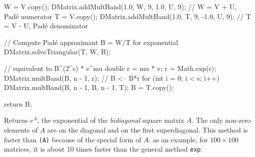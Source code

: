 \begin{code}
\begin{hide}
{      W = V.copy();
      DMatrix.addMultBand(1.0, W, 9, 1.0, U, 9); // W = V + U, Padé numerator
      T = V.copy();
      DMatrix.addMultBand(1.0, T, 9, -1.0, U, 9); // T = V - U, Padé denominator

      // Compute Padé approximant B = W/T for exponential
      DMatrix.solveTriangular(T, W, B);

      // equivalent to B^(2^s) * e^mu
      double r = mu * v;
      r = Math.exp(r);
      DMatrix.multBand(B, n - 1, r); // B <-- B*r
      for (int i = 0; i < s; i++) {
         DMatrix.multBand(B, n - 1, B, n - 1, T);
         B = T.copy();
      }

      return B;
	}\end{hide}
\end{code}
\begin{tabb} Returns $e^A$, the exponential of the \emph{bidiagonal}
 square matrix $A$. The only non-zero elements of $A$ are on the diagonal and
 on the first superdiagonal. This method is faster than
\texttt{(A)} because of the special form of
$A$: as an example, for $100\times 100$ matrices, it is about 10 times faster
than the general method \texttt{exp}.
\end{tabb}
\begin{htmlonly}
\end{htmlonly}
